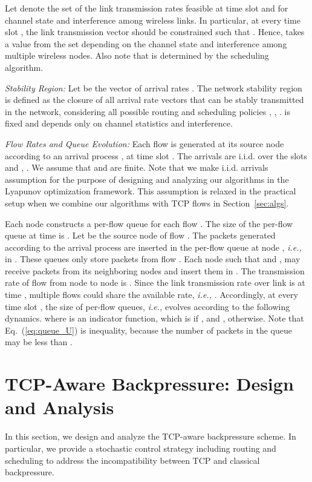 \documentclass[conference]{IEEEtran}
\newcommand{\ie}{{\em i.e., }}
\begin{document}
Let  denote the set of the link transmission rates feasible at time slot  and for channel state  and interference among wireless links. In particular, at every time slot , the link transmission vector  should be constrained such that  . Hence,  takes a value from the set  depending on the channel state and interference among multiple wireless nodes. Also note that  is determined by the scheduling algorithm.


{\em Stability Region:}
Let  be the vector of arrival rates . The network stability region  is defined as the closure of all arrival rate vectors that can be stably transmitted in the network, considering all possible routing and scheduling policies \cite{tass_eph1}, \cite{tass_eph2}, \cite{neely_mod}.  is fixed and depends only on channel statistics and interference.



{\em Flow Rates and Queue Evolution:}  Each flow  is generated at its source node according to an arrival process ,  at time slot . The arrivals are i.i.d. over the slots and , . We assume that  and  are finite. Note that we make i.i.d. arrivals assumption for the purpose of designing and analyzing our algorithms in the Lyapunov optimization framework. This assumption is relaxed in the practical setup when we combine our algorithms with TCP flows in Section~\ref{sec:algs}.

Each node  constructs a per-flow queue  for each flow . The size of the per-flow queue  at time  is .
Let  be the source node of flow . The packets generated according to the arrival process  are inserted in the per-flow queue at node , \ie in . These queues only store packets from flow . Each node  such that  and , may receive packets from its neighboring nodes and insert them in . The transmission rate of flow  from node  to node  is . Since the link transmission rate over link  is  at time , multiple flows could share the available rate, \ie . Accordingly, at every time slot , the size of per-flow queues, \ie  evolves according to the following dynamics.
 where  is an indicator function, which is  if , and , otherwise. Note that Eq.~(\ref{eq:queue_U}) is inequality, because the number of packets in the queue  may be less than .









\section{TCP-Aware Backpressure: Design and Analysis}\label{sec:opt}
In this section, we design and analyze the TCP-aware backpressure scheme. In particular, we provide a stochastic control strategy including routing and scheduling to address the incompatibility between TCP and classical backpressure.
\end{document}

